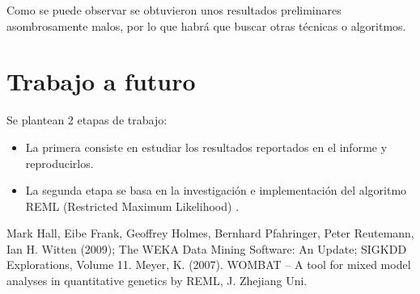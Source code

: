 \documentclass[11pt,a4paper]{article}
\begin{document}
Como se puede observar se obtuvieron unos resultados preliminares asombrosamente malos, por lo que habrá que buscar otras técnicas o algoritmos.

\section{Trabajo a futuro}

Se plantean 2 etapas de trabajo:
\begin{itemize}
	\item La primera consiste en estudiar los resultados reportados en el informe y reproducirlos. 
	\item La segunda etapa se basa en la investigación e implementación del algoritmo REML (Restricted Maximum Likelihood) \cite{bib:REML}.
\end{itemize}

\begin{thebibliography}{99}
Mark Hall, Eibe Frank, Geoffrey Holmes, Bernhard Pfahringer, Peter Reutemann, Ian H. Witten (2009); The WEKA Data Mining Software: An Update; SIGKDD Explorations, Volume 11.
Meyer, K. (2007). WOMBAT – A tool for mixed model analyses in quantitative genetics by REML, J. Zhejiang Uni.
\end{thebibliography}
\end{document}
